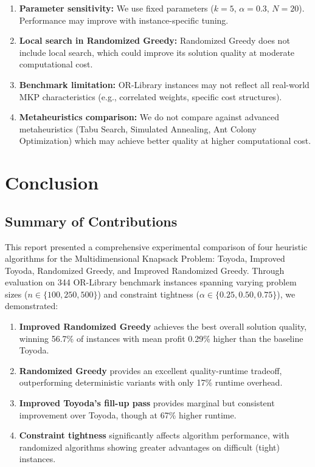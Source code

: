 \documentclass[12pt,a4paper]{article}
\begin{document}
\begin{enumerate}
    \item \textbf{Parameter sensitivity:} We use fixed parameters ($k = 5$, $\alpha = 0.3$, $N = 20$). Performance may improve with instance-specific tuning.
    \item \textbf{Local search in Randomized Greedy:} Randomized Greedy does not include local search, which could improve its solution quality at moderate computational cost.
    \item \textbf{Benchmark limitation:} OR-Library instances may not reflect all real-world MKP characteristics (e.g., correlated weights, specific cost structures).
    \item \textbf{Metaheuristics comparison:} We do not compare against advanced metaheuristics (Tabu Search, Simulated Annealing, Ant Colony Optimization) which may achieve better quality at higher computational cost.
\end{enumerate}

\section{Conclusion}
\label{sec:conclusion}

\subsection{Summary of Contributions}

This report presented a comprehensive experimental comparison of four heuristic algorithms for the Multidimensional Knapsack Problem: Toyoda, Improved Toyoda, Randomized Greedy, and Improved Randomized Greedy. Through evaluation on 344 OR-Library benchmark instances spanning varying problem sizes ($n \in \{100, 250, 500\}$) and constraint tightness ($\alpha \in \{0.25, 0.50, 0.75\}$), we demonstrated:

\begin{enumerate}
    \item \textbf{Improved Randomized Greedy} achieves the best overall solution quality, winning 56.7\% of instances with mean profit 0.29\% higher than the baseline Toyoda.
    \item \textbf{Randomized Greedy} provides an excellent quality-runtime tradeoff, outperforming deterministic variants with only 17\% runtime overhead.
    \item \textbf{Improved Toyoda's fill-up pass} provides marginal but consistent improvement over Toyoda, though at 67\% higher runtime.
    \item \textbf{Constraint tightness} significantly affects algorithm performance, with randomized algorithms showing greater advantages on difficult (tight) instances.
\end{enumerate}
\end{document}
